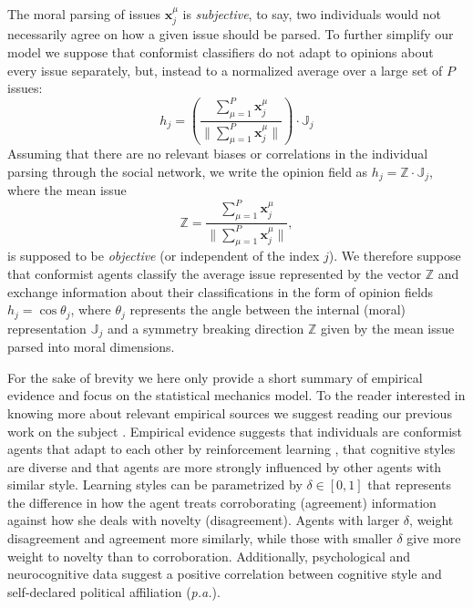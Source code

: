 \documentclass[twocolumn,showpacs]{revtex4-1}
\begin{document}
The moral parsing of issues $\mathbf{x}_j^\mu$ is {\it subjective}, to say, two individuals would not necessarily agree on
  how a given issue should be parsed. To further simplify our model we suppose that conformist classifiers
 do not adapt to opinions about every issue separately, but, instead to a normalized average over a large set of $P$ issues: 
\begin{equation}
 h_j= \left(\frac{\sum_{\mu=1}^P\mathbf{x}_j^\mu}{\|\sum_{\mu=1}^P\mathbf{x}_j^\mu\|}\right) \cdot\mathbb{J}_j
\label{opinion_field}
\end{equation}
Assuming that there are no relevant biases or correlations in the individual parsing through the social network, we write the opinion field as  $h_j=\mathbb{Z}\cdot\mathbb{J}_j$, where the mean issue
\begin{equation}
\mathbb{Z}=\frac{\sum_{\mu=1}^P\mathbf{x}_j^\mu}{\|\sum_{\mu=1}^P\mathbf{x}_j^\mu\|},
\end{equation}
 is supposed to be {\it objective} (or independent of the index $j$). We therefore suppose that conformist agents classify the average issue represented by the vector $\mathbb{Z}$ and exchange information 
about their classifications in the form of opinion fields $h_j=\cos\theta_j$, where $\theta_j$ represents the angle between the internal (moral) representation 
$\mathbb{J}_j$ and a symmetry breaking direction $\mathbb{Z}$ given by the mean issue parsed into moral dimensions.

For the sake of brevity  we here only provide a short summary of empirical evidence and  focus on the statistical mechanics model. To the reader interested in knowing more about relevant empirical sources we suggest reading our previous work on the subject \cite{Cavi10}. Empirical evidence suggests that individuals are conformist agents that adapt to each other by reinforcement learning \cite{Klucharev}, that
cognitive styles are diverse \cite{Amodio} and that 
agents are more strongly influenced by other agents with similar style. Learning styles can be parametrized
 by $\delta \in [0,1]$ that represents the difference in how the agent
treats corroborating (agreement) information against how she deals with novelty (disagreement). Agents with larger $\delta$, weight disagreement and agreement more similarly, while those with smaller $\delta$ give more weight to 
novelty than to corroboration. 
Additionally, psychological and neurocognitive data suggest a positive correlation between cognitive style and 
self-declared political affiliation ({\it p.a.})\cite{Amodio}.  
\end{document}
